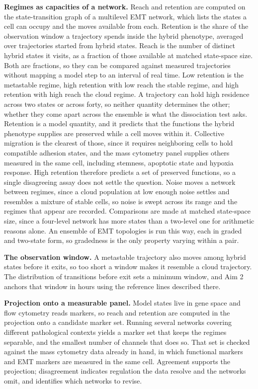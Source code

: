 \documentclass[12pt,letterpaper]{article}
\newcommand{\chg}[1]{\textcolor{chgcolor}{#1}}
\newcommand{\chg}[1]{#1}
\newcommand{\lead}[1]{\textbf{#1}}
\begin{document}
\lead{Regimes as capacities of a network.} Reach and retention are computed on the state-transition graph of a multilevel EMT network, which lists the states a cell can occupy and the moves available from each. \chg{Retention is the share of the observation window a trajectory spends inside the hybrid phenotype, averaged over trajectories started from hybrid states. Reach is the number of distinct hybrid states it visits, as a fraction of those available at matched state-space size. Both are fractions, so they can be compared against measured trajectories without mapping a model step to an interval of real time. Low retention is the metastable regime, high retention with low reach the stable regime, and high retention with high reach the cloud regime. A trajectory can hold high residence across two states or across forty, so neither quantity determines the other; whether they come apart across the ensemble is what the dissociation test asks.} Retention is a model quantity, and it predicts that the functions the hybrid phenotype supplies are preserved while a cell moves within it. Collective migration is the clearest of those, since it requires neighboring cells to hold compatible adhesion states, and the mass cytometry panel supplies others measured in the same cell, including stemness, apoptotic state and hypoxia response. High retention therefore predicts a set of preserved functions, so a single disagreeing assay does not settle the question. Noise moves a network between regimes, since a cloud population at low enough noise settles and resembles a mixture of stable cells, so noise is swept across its range and the regimes that appear are recorded. Comparisons are made at matched state-space size, since a four-level network has more states than a two-level one for arithmetic reasons alone. An ensemble of EMT topologies is run this way, each in graded and two-state form, so gradedness is the only property varying within a pair.

\lead{The observation window.} A metastable trajectory also moves among hybrid states before it exits, so too short a window makes it resemble a cloud trajectory. The distribution of transitions before exit sets a minimum window, and Aim 2 anchors that window in hours using the reference lines described there.

\lead{Projection onto a measurable panel.} Model states live in gene space and flow cytometry reads markers, so reach and retention are computed in the projection onto a candidate marker set. Running several networks covering different pathological contexts yields a marker set that keeps the regimes separable, and the smallest number of channels that does so. That set is checked against the mass cytometry data already in hand, in which functional markers and EMT markers are measured in the same cell. Agreement supports the projection; disagreement indicates regulation the data resolve and the networks omit, and identifies which networks to revise.
\end{document}
